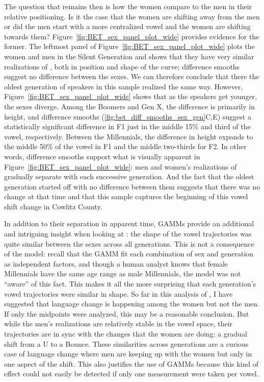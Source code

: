 The question that remains then is how the women compare to the men in their relative positioning. Is it the case that the women are shifting away from the men or did the men start with a more centralized vowel and the women are shifting towards them? Figure~\ref{fig:BET_sex_panel_plot_wide} provides evidence for the former. The leftmost panel of Figure~\ref{fig:BET_sex_panel_plot_wide} plots the women and men in the Silent Generation and shows that they have very similar realizations of \bet, both in position and shape of the curve; difference smooths suggest no difference between the sexes. We can therefore conclude that there the oldest generation of speakers in this sample realized \bet the same way. However, Figure~\ref{fig:BET_sex_panel_plot_wide} shows that as the speakers get younger, the sexes diverge. Among the Boomers and Gen X, the difference is primarily in height, and difference smooths (\ref{fig:bet_diff_smooths_sex_gen}C,E) suggest a statistically significant difference in F1 just in the middle 15\% and third of the vowel, respectively. Between the Millennials, the difference in height expands to the middle 50\% of the vowel in F1 and the middle two-thirds for F2. In other words, difference smooths support what is visually apparent in Figure~\ref{fig:BET_sex_panel_plot_wide}: men and women's realizations of \bet gradually separate with each successive generation. And the fact that the oldest generation started off with no difference between them suggests that there was no change at that time and that this sample captures the beginning of this vowel shift change in Cowlitz County.

In addition to their separation in apparent time, GAMMs provide an additional and intriguing insight when looking at \bet: the shape of the vowel trajectories was quite similar between the sexes across all generations. This is not a consequence of the model: recall that the GAMM fit each combination of sex and generation as independent factors, and though a human analyst knows that female Millennials have the same age range as male Millennials, the model was not ``aware'' of this fact. This makes it all the more surprising that each generation's vowel trajectories were similar in shape. So far in this analysis of \bet, I have suggested that language change is happening among the women but not the men. If only the midpoints were analyzed, this may be a reasonable conclusion. But while the men's realizations are relatively stable in the vowel space, their trajectories are in sync with the changes that the women are doing: a gradual shift from a U to a Bounce. These similarities across generations are a curious case of language change where men are keeping up with the women but only in one aspect of the shift. This also justifies the use of GAMMs because this kind of effect could not easily be detected if only one measurement were taken per vowel.

